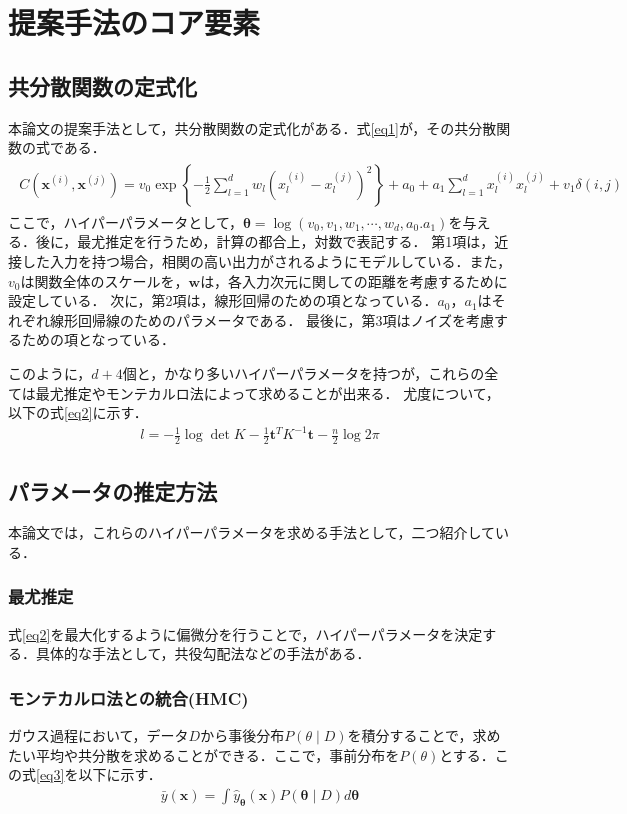 \documentclass[10pt,onecolumn]{jsarticle}
\begin{document}
\section{提案手法のコア要素}
\subsection{共分散関数の定式化}
本論文の提案手法として，共分散関数の定式化がある．式\eqref{eq1}が，その共分散関数の式である．
	\begin{align}
		\label{eq1}
		\begin{aligned}
		C\left(\boldsymbol{x}^{(i)}, \boldsymbol{x}^{(j)}\right)= v_{0} \exp \left\{-\frac{1}{2} \sum_{l=1}^{d} w_{l}\left(x_{l}^{(i)}-x_{l}^{(j)}\right)^{2}\right\}
		+a_{0}+a_{1} \sum_{l=1}^{d} x_{l}^{(i)} x_{l}^{(j)}+v_{1} \delta(i, j)
\end{aligned}
	\end{align}
	ここで，ハイパーパラメータとして，$\bm{\theta}=\log \left(v_0,v_1,w_1,\cdots,w_d,a_0.a_1\right)$を与える．後に，最尤推定を行うため，計算の都合上，対数で表記する．
	第1項は，近接した入力を持つ場合，相関の高い出力がされるようにモデルしている．また，$v_0$は関数全体のスケールを，$\bm{w}$は，各入力次元に関しての距離を考慮するために設定している．
	次に，第2項は，線形回帰のための項となっている．$a_0$，$a_1$はそれぞれ線形回帰線のためのパラメータである．
	最後に，第3項はノイズを考慮するための項となっている．

	このように，$d+4$個と，かなり多いハイパーパラメータを持つが，これらの全ては最尤推定やモンテカルロ法によって求めることが出来る．
	尤度について，以下の式\eqref{eq2}に示す．
	\begin{align}
		\label{eq2}
l=-\frac{1}{2} \log \operatorname{det} K-\frac{1}{2} \boldsymbol{t}^{T} K^{-1} \boldsymbol{t}-\frac{n}{2} \log 2 \pi
\end{align}

\subsection{パラメータの推定方法}
本論文では，これらのハイパーパラメータを求める手法として，二つ紹介している．
\subsubsection{最尤推定}
式\eqref{eq2}を最大化するように偏微分を行うことで，ハイパーパラメータを決定する．具体的な手法として，共役勾配法などの手法がある．
\subsubsection{モンテカルロ法との統合(HMC)}
ガウス過程において，データ$D$から事後分布$P(\theta \mid D)$を積分することで，求めたい平均や共分散を求めることができる．ここで，事前分布を$P(\theta)$とする．この式\eqref{eq3}を以下に示す．
\begin{align}
	\label{eq3}
	\bar{y}(\boldsymbol{x})=\int \hat{y}_{\boldsymbol{\theta}}(\boldsymbol{x}) P(\boldsymbol{\theta} \mid D) d \boldsymbol{\theta}
\end{align}
\end{document}
